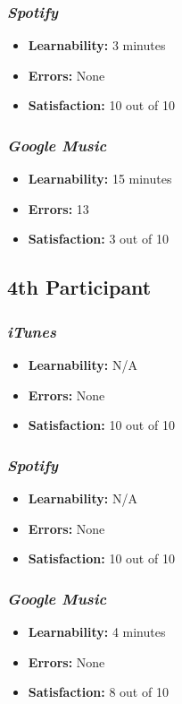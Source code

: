 \documentclass{article}
\begin{document}
\begin{multicols}{2}
\subsubsection{\it Spotify}
\begin{itemize}
	\item {\bf Learnability:} 3 minutes
	\item {\bf Errors:} None
	\item {\bf Satisfaction:} 10 out of 10 
\end{itemize}

\subsubsection{\it Google Music}
\begin{itemize}
\item {\bf Learnability:} 15 minutes
	\item {\bf Errors:} 13
	\item {\bf Satisfaction:} 3 out of 10 
\end{itemize}

\subsection{4th Participant}

\subsubsection{\it iTunes}
\begin{itemize}
	\item {\bf Learnability:} N/A
	\item {\bf Errors:}  None
	\item {\bf Satisfaction:} 10 out of 10 
\end{itemize}

\subsubsection{\it Spotify}
\begin{itemize}
	\item {\bf Learnability:} N/A
	\item {\bf Errors:} None
	\item {\bf Satisfaction:} 10 out of 10 
\end{itemize}

\subsubsection{\it Google Music}
\begin{itemize}
\item {\bf Learnability:} 4 minutes
	\item {\bf Errors:} None
	\item {\bf Satisfaction:} 8 out of 10 
\end{itemize}


\end{multicols}
\end{document}
